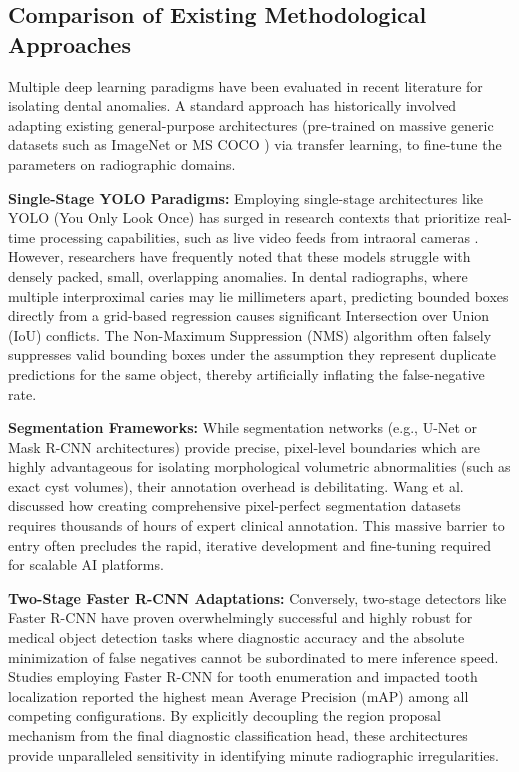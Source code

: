\subsection{Comparison of Existing Methodological Approaches}
\par Multiple deep learning paradigms have been evaluated in recent literature for isolating dental anomalies. A standard approach has historically involved adapting existing general-purpose architectures (pre-trained on massive generic datasets such as ImageNet or MS COCO \cite{lin2014microsoft}) via transfer learning, to fine-tune the parameters on radiographic domains.
\par \textbf{Single-Stage YOLO Paradigms:} Employing single-stage architectures like YOLO (You Only Look Once) has surged in research contexts that prioritize real-time processing capabilities, such as live video feeds from intraoral cameras \cite{nguyen2023dental}. However, researchers have frequently noted that these models struggle with densely packed, small, overlapping anomalies. In dental radiographs, where multiple interproximal caries may lie millimeters apart, predicting bounded boxes directly from a grid-based regression causes significant Intersection over Union (IoU) conflicts. The Non-Maximum Suppression (NMS) algorithm often falsely suppresses valid bounding boxes under the assumption they represent duplicate predictions for the same object, thereby artificially inflating the false-negative rate.
\par \textbf{Segmentation Frameworks:} While segmentation networks (e.g., U-Net or Mask R-CNN architectures) provide precise, pixel-level boundaries which are highly advantageous for isolating morphological volumetric abnormalities (such as exact cyst volumes), their annotation overhead is debilitating. Wang et al. \cite{wang2022automated} discussed how creating comprehensive pixel-perfect segmentation datasets requires thousands of hours of expert clinical annotation. This massive barrier to entry often precludes the rapid, iterative development and fine-tuning required for scalable AI platforms.
\par \textbf{Two-Stage Faster R-CNN Adaptations:} Conversely, two-stage detectors like Faster R-CNN have proven overwhelmingly successful and highly robust for medical object detection tasks where diagnostic accuracy and the absolute minimization of false negatives cannot be subordinated to mere inference speed. Studies employing Faster R-CNN for tooth enumeration \cite{tuzoff2019tooth} and impacted tooth localization \cite{kim2020automated} reported the highest mean Average Precision (mAP) among all competing configurations. By explicitly decoupling the region proposal mechanism from the final diagnostic classification head, these architectures provide unparalleled sensitivity in identifying minute radiographic irregularities.


